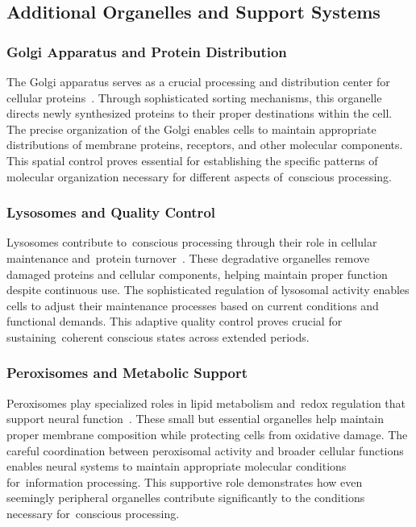 \subsection*{Additional Organelles and Support Systems~}

\subsubsection{Golgi Apparatus and Protein Distribution~~}

The Golgi apparatus serves as a crucial processing and distribution center for cellular proteins~\cite{Ramirez2011}. Through sophisticated sorting mechanisms, this organelle directs newly synthesized proteins to their proper destinations within the cell. The precise organization of the Golgi enables cells to maintain appropriate distributions of membrane proteins, receptors, and other molecular components. This spatial control proves essential for establishing the specific patterns of molecular organization necessary for different aspects of~conscious processing.

\subsubsection{Lysosomes and Quality Control~~}

Lysosomes contribute to~conscious processing through their role in cellular maintenance and~protein turnover~\cite{Nicholls2013}. These degradative organelles remove damaged proteins and cellular components, helping maintain proper function despite continuous use. The sophisticated regulation of lysosomal activity enables cells to adjust their maintenance processes based on current conditions and functional demands. This adaptive quality control proves crucial for sustaining~coherent conscious states across extended periods.

\subsubsection{Peroxisomes and Metabolic Support~~}

Peroxisomes play specialized roles in lipid metabolism and~redox regulation that support neural function~\cite{Smith2013}. These small but essential organelles help maintain proper membrane composition while protecting cells from oxidative damage. The careful coordination between peroxisomal activity and broader cellular functions enables neural systems to maintain appropriate molecular conditions for~information processing. This supportive role demonstrates how even seemingly peripheral organelles contribute significantly to the conditions necessary for~conscious processing.

